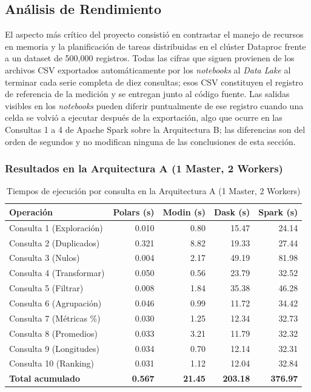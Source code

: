 \subsection{Análisis de Rendimiento}
\label{sec:rendimiento}

El aspecto más crítico del proyecto consistió en contrastar el manejo de recursos en memoria y la planificación de tareas distribuidas en el clúster Dataproc frente a un dataset de 500,000 registros. Todas las cifras que siguen provienen de los archivos CSV exportados automáticamente por los \textit{notebooks} al \textit{Data Lake} al terminar cada serie completa de diez consultas; esos CSV constituyen el registro de referencia de la medición y se entregan junto al código fuente. Las salidas visibles en los \textit{notebooks} pueden diferir puntualmente de ese registro cuando una celda se volvió a ejecutar después de la exportación, algo que ocurre en las Consultas 1 a 4 de Apache Spark sobre la Arquitectura B; las diferencias son del orden de segundos y no modifican ninguna de las conclusiones de esta sección.

\subsubsection{Resultados en la Arquitectura A (1 Master, 2 Workers)}

\begin{table}[H]
\centering
\caption{Tiempos de ejecución por consulta en la Arquitectura A (1 Master, 2 Workers)}
\label{tab:tiemposA}
\vspace{0.2cm}
\small
\begin{tabular}{lrrrr}
\toprule
\textbf{Operación} & \textbf{Polars (s)} & \textbf{Modin (s)} & \textbf{Dask (s)} & \textbf{Spark (s)} \\
\midrule
Consulta 1 (Exploración)     &   0.010 &   0.80 &  15.47 &  24.14 \\
Consulta 2 (Duplicados)      &   0.321 &   8.82 &  19.33 &  27.44 \\
Consulta 3 (Nulos)           &   0.004 &   2.17 &  49.19 &  81.98 \\
Consulta 4 (Transformar)     &   0.050 &   0.56 &  23.79 &  32.52 \\
Consulta 5 (Filtrar)         &   0.008 &   1.84 &  35.38 &  46.28 \\
Consulta 6 (Agrupación)      &   0.046 &   0.99 &  11.72 &  34.42 \\
Consulta 7 (Métricas \%)     &   0.030 &   1.25 &  12.34 &  32.73 \\
Consulta 8 (Promedios)       &   0.033 &   3.21 &  11.79 &  32.32 \\
Consulta 9 (Longitudes)      &   0.034 &   0.70 &  12.14 &  32.31 \\
Consulta 10 (Ranking)        &   0.031 &   1.12 &  12.04 &  32.84 \\
\midrule
\textbf{Total acumulado}      & \textbf{0.567} & \textbf{21.45} & \textbf{203.18} & \textbf{376.97} \\
\bottomrule
\end{tabular}
\end{table}

